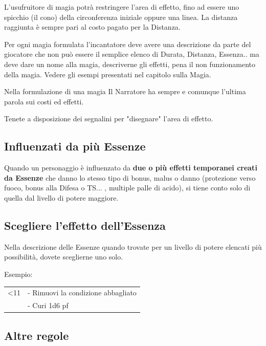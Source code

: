 \documentclass[a4paper,11pt,twoside,openany]{book}
\begin{document}
L'usufruitore di magia potrà restringere l'area di effetto, fino ad essere uno spicchio (il cono) della circonferenza iniziale oppure una linea. La distanza raggiunta è sempre pari al costo pagato per la Distanza.

Per ogni magia formulata l'incantatore deve avere una descrizione da parte del giocatore che non può essere il semplice elenco di Durata, Distanza, Essenza.. ma deve dare un nome alla magia, descriverne gli effetti, pena il non funzionamento della magia. Vedere gli esempi presentati nel capitolo sulla Magia.

Nella formulazione di una magia Il Narratore ha sempre e comunque l'ultima parola sui costi ed effetti.

Tenete a disposizione dei segnalini per "disegnare" l'area di effetto.

\subsection{Influenzati da più Essenze}

\label{influenzati-da-piu-essenze}

Quando un personaggio è influenzato da \textbf{due o più effetti temporanei creati da Essenze} che danno lo stesso tipo di bonus, malus o danno (protezione verso fuoco, bonus alla Difesa o TS... , multiple palle di acido), si tiene conto solo di quella dal livello di potere maggiore.

\subsection{Scegliere l'effetto dell'Essenza}

\label{scegliere-leffetto-dellessenza}

Nella descrizione delle Essenze quando trovate per un livello di potere elencati più possibilità, dovete sceglierne uno solo.

Esempio:

\medskip

\begin{tabular}{L{3cm} L{13cm}}
\toprule
<11 & - Rimuovi la condizione abbagliato\tabularnewline
& - Curi 1d6 pf
\end{tabular}

\subsection{Altre regole}
\end{document}
